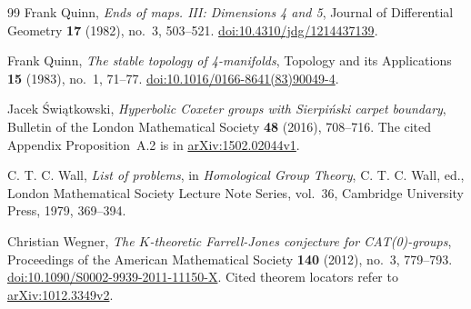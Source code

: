 \documentclass[11pt]{article}
\theoremstyle{definition}
\theoremstyle{remark}
\begin{document}
{\begin{thebibliography}{99}
Frank Quinn,
\emph{Ends of maps. III: Dimensions 4 and 5},
Journal of Differential Geometry \textbf{17} (1982), no.~3, 503--521.
\href{https://doi.org/10.4310/jdg/1214437139}{doi:10.4310/jdg/1214437139}.

Frank Quinn,
\emph{The stable topology of 4-manifolds},
Topology and its Applications \textbf{15} (1983), no.~1, 71--77.
\href{https://doi.org/10.1016/0166-8641(83)90049-4}{doi:10.1016/0166-8641(83)90049-4}.

Jacek \'Swi{\k a}tkowski,
\emph{Hyperbolic Coxeter groups with Sierpi\'nski carpet boundary},
Bulletin of the London Mathematical Society \textbf{48} (2016), 708--716.
The cited Appendix Proposition~A.2 is in
\href{https://arxiv.org/abs/1502.02044v1}{arXiv:1502.02044v1}.

C. T. C. Wall,
\emph{List of problems},
in \emph{Homological Group Theory}, C. T. C. Wall, ed.,
London Mathematical Society Lecture Note Series, vol.~36,
Cambridge University Press, 1979, 369--394.

Christian Wegner,
\emph{The $K$-theoretic Farrell-Jones conjecture for CAT(0)-groups},
Proceedings of the American Mathematical Society \textbf{140} (2012),
no.~3, 779--793.
\href{https://doi.org/10.1090/S0002-9939-2011-11150-X}{doi:10.1090/S0002-9939-2011-11150-X}.
Cited theorem locators refer to
\href{https://arxiv.org/abs/1012.3349v2}{arXiv:1012.3349v2}.

\end{thebibliography}
}
\end{document}
